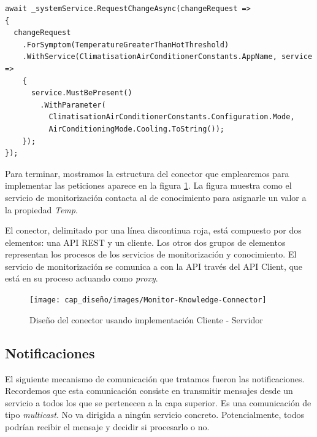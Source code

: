 \begin{lstlisting}[language={[Sharp]C},caption={Implementación de la misma petición siguiendo el patrón \emph{builder}.},captionpos=b, label=ls:analysis-api-cliente-request-builder]
await _systemService.RequestChangeAsync(changeRequest =>
{
  changeRequest
    .ForSymptom(TemperatureGreaterThanHotThreshold)
    .WithService(ClimatisationAirConditionerConstants.AppName, service =>
    {
      service.MustBePresent()
        .WithParameter(
          ClimatisationAirConditionerConstants.Configuration.Mode,
          AirConditioningMode.Cooling.ToString());
    });
});
\end{lstlisting}

Para terminar, mostramos la estructura del conector que emplearemos para implementar las peticiones aparece en la figura \ref{fig:monitor-knowledge-connector-architecture}. La figura muestra como el servicio de monitorización contacta al de conocimiento para asignarle un valor a la propiedad \emph{Temp}.

El conector, delimitado por una línea discontinua roja, está compuesto por dos elementos: una API REST y un cliente. Los otros dos grupos de elementos representan los procesos de los servicios de monitorización y conocimiento. El servicio de monitorización se comunica a con la API través del API Client, que está en su proceso actuando como \emph{proxy}.

\begin{figure}[htb]
  \centering
  \texttt{[image: cap\_diseño/images/Monitor-Knowledge-Connector]}
  \caption{Diseño del conector usando implementación Cliente - Servidor}
  \label{fig:monitor-knowledge-connector-architecture}
\end{figure}

\subsection{Notificaciones}
\label{sec:notificaciones}

El siguiente mecanismo de comunicación que tratamos fueron las notificaciones. Recordemos que esta comunicación consiste en transmitir mensajes desde un servicio a todos los que se pertenecen a la capa superior. Es una comunicación de tipo \emph{multicast}. No va dirigida a ningún servicio concreto. Potencialmente, todos podrían recibir el mensaje y decidir si procesarlo o no.

